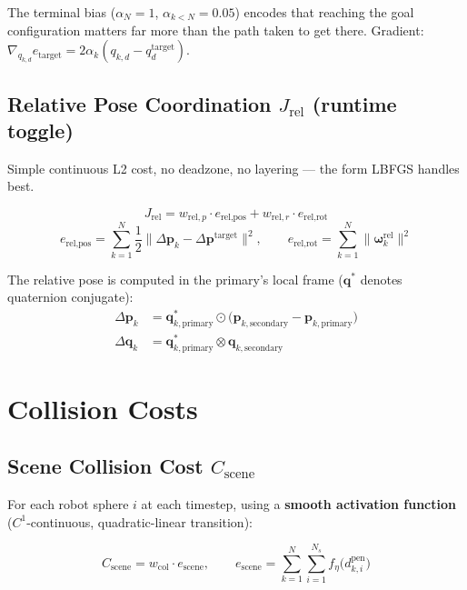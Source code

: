 \documentclass[11pt,a4paper]{article}
\begin{document}
The terminal bias ($\alpha_N = 1$, $\alpha_{k<N} = 0.05$) encodes that reaching the
goal configuration matters far more than the path taken to get there.
Gradient: $\nabla_{q_{k,d}} e_{\text{target}} = 2 \alpha_k (q_{k,d} - q_d^{\text{target}})$.

\subsection{Relative Pose Coordination $J_{\text{rel}}$ (runtime toggle)}

Simple continuous L2 cost, no deadzone, no layering — the form LBFGS handles best.

\begin{equation}
J_{\text{rel}} = w_{\text{rel},p} \cdot e_{\text{rel,pos}} + w_{\text{rel},r} \cdot e_{\text{rel,rot}}
\label{eq:rel}
\end{equation}
%
\begin{equation}
e_{\text{rel,pos}} = \sum_{k=1}^{N}
\frac{1}{2} \bigl\lVert \Delta\mathbf{p}_k - \Delta\mathbf{p}^{\text{target}} \bigr\rVert^2, \qquad
e_{\text{rel,rot}} = \sum_{k=1}^{N}
\bigl\lVert \boldsymbol{\omega}_k^{\text{rel}} \bigr\rVert^2
\label{eq:erel}
\end{equation}

The relative pose is computed in the primary's local frame ($\mathbf{q}^*$ denotes
quaternion conjugate):
%
\begin{align}
\Delta\mathbf{p}_k &= \mathbf{q}_{k,\text{primary}}^* \odot \bigl( \mathbf{p}_{k,\text{secondary}} - \mathbf{p}_{k,\text{primary}} \bigr) \\
\Delta\mathbf{q}_k &= \mathbf{q}_{k,\text{primary}}^* \otimes \mathbf{q}_{k,\text{secondary}}
\end{align}

\section{Collision Costs}

\subsection{Scene Collision Cost $C_{\text{scene}}$}

For each robot sphere $i$ at each timestep, using a \textbf{smooth activation function}
($C^1$-continuous, quadratic-linear transition):

\begin{equation}
C_{\text{scene}} = w_{\text{col}} \cdot e_{\text{scene}}, \qquad
e_{\text{scene}} = \sum_{k=1}^{N} \sum_{i=1}^{N_s} f_{\eta}\!\bigl(d_{k,i}^{\text{pen}}\bigr)
\label{eq:scene}
\end{equation}
\end{document}
